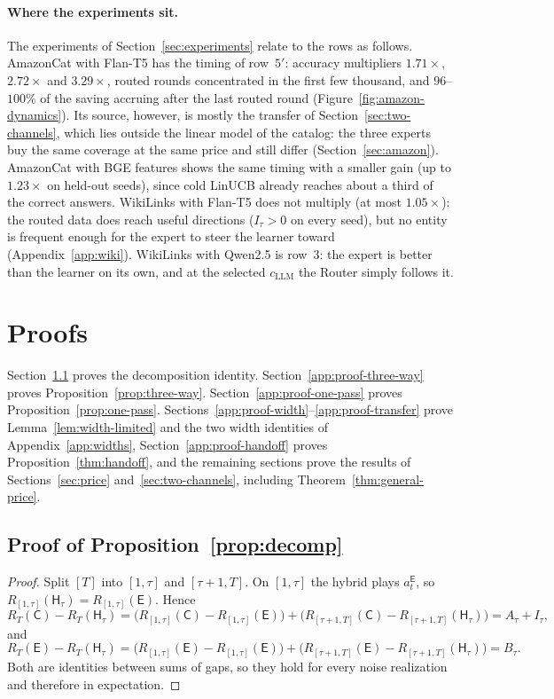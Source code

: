 \documentclass[anon]{alt2027} %
\newcommand{\Cold}{\mathsf{C}}
\newcommand{\Exp}{\mathsf{E}}
\newcommand{\Hyb}{\mathsf{H}}
\begin{document}
\paragraph{Where the experiments sit.}
The experiments of Section~\ref{sec:experiments} relate to the rows as
follows. AmazonCat with Flan-T5 has the timing of row~$5'$: accuracy multipliers
$1.71\times$, $2.72\times$ and $3.29\times$, routed rounds concentrated in the
first few thousand, and $96$--$100\%$ of the saving accruing after the last
routed round (Figure~\ref{fig:amazon-dynamics}). Its source, however, is
mostly the transfer of Section~\ref{sec:two-channels}, which lies outside the
linear model of the catalog: the three experts buy the same coverage at the
same price and still differ (Section~\ref{sec:amazon}). AmazonCat with BGE
features shows the same timing with a smaller gain (up to $1.23\times$ on
held-out seeds), since cold LinUCB already reaches about a third of the
correct answers. WikiLinks with Flan-T5 does not multiply (at most
$1.05\times$): the routed data does reach useful directions ($I_\tau>0$ on
every seed), but no entity is frequent enough for the expert to steer the
learner toward (Appendix~\ref{app:wiki}). WikiLinks with Qwen2.5 is row~3: the
expert is better than the learner on its own, and at the selected $c_{\mathrm{LLM}}$
the Router simply follows it.

\section{Proofs}
\label{app:proofs}

Section~\ref{app:proof-decomp} proves the decomposition identity.
Section~\ref{app:proof-three-way} proves
Proposition~\ref{prop:three-way}.
Section~\ref{app:proof-one-pass} proves Proposition~\ref{prop:one-pass}.
Sections~\ref{app:proof-width}--\ref{app:proof-transfer} prove
Lemma~\ref{lem:width-limited} and the two width identities of
Appendix~\ref{app:widths}, Section~\ref{app:proof-handoff} proves
Proposition~\ref{thm:handoff}, and the remaining sections prove the results of
Sections~\ref{sec:price} and~\ref{sec:two-channels}, including
Theorem~\ref{thm:general-price}.

\subsection{Proof of Proposition~\ref{prop:decomp}}
\label{app:proof-decomp}

\begin{proof}
Split $[T]$ into $[1,\tau]$ and $[\tau+1,T]$. On $[1,\tau]$ the hybrid plays
$a_t^{\Exp}$, so $R_{[1,\tau]}(\Hyb_\tau)=R_{[1,\tau]}(\Exp)$. Hence
\[
R_T(\Cold)-R_T(\Hyb_\tau)
=\bigl(R_{[1,\tau]}(\Cold)-R_{[1,\tau]}(\Exp)\bigr)
+\bigl(R_{[\tau+1,T]}(\Cold)-R_{[\tau+1,T]}(\Hyb_\tau)\bigr)
=A_\tau+I_\tau ,
\]
and
\[
R_T(\Exp)-R_T(\Hyb_\tau)
=\bigl(R_{[1,\tau]}(\Exp)-R_{[1,\tau]}(\Exp)\bigr)
+\bigl(R_{[\tau+1,T]}(\Exp)-R_{[\tau+1,T]}(\Hyb_\tau)\bigr)
=B_\tau .
\]
Both are identities between sums of gaps, so they hold for every noise
realization and therefore in expectation.
\end{proof}
\end{document}
